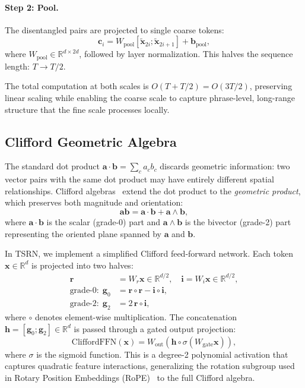 \documentclass[11pt,a4paper]{article}
\newcommand{\R}{\mathbb{R}}
\begin{document}
\paragraph{Step 2: Pool.}  The disentangled pairs are projected to
single coarse tokens:
\begin{equation}
\bm{c}_i = W_{\text{pool}}[\tilde{\bm{x}}_{2i};
  \tilde{\bm{x}}_{2i+1}] + \bm{b}_{\text{pool}},
\label{eq:pool}
\end{equation}
where $W_{\text{pool}} \in \R^{d \times 2d}$, followed by layer
normalization.  This halves the sequence length: $T \to T/2$.

The total computation at both scales is $O(T + T/2) = O(3T/2)$,
preserving linear scaling while enabling the coarse scale to capture
phrase-level, long-range structure that the fine scale processes
locally.

\subsection{Clifford Geometric Algebra}
\label{sec:clifford}

The standard dot product $\bm{a} \cdot \bm{b} = \sum_c a_c b_c$
discards geometric information: two vector pairs with the same dot
product may have entirely different spatial relationships.  Clifford
algebras~\citep{hestenes1984clifford} extend the dot product to the
\emph{geometric product}, which preserves both magnitude and
orientation:
\begin{equation}
\bm{a}\bm{b} = \bm{a} \cdot \bm{b} + \bm{a} \wedge \bm{b},
\end{equation}
where $\bm{a} \cdot \bm{b}$ is the scalar (grade-0) part and
$\bm{a} \wedge \bm{b}$ is the bivector (grade-2) part representing
the oriented plane spanned by $\bm{a}$ and $\bm{b}$.

In TSRN, we implement a simplified Clifford feed-forward network.
Each token $\bm{x} \in \R^d$ is projected into two halves:
\begin{align}
\bm{r} &= W_r \bm{x} \in \R^{d/2}, \quad
\bm{i} = W_i \bm{x} \in \R^{d/2}, \\
\text{grade-0:}\ \ \bm{g}_0 &= \bm{r} \circ \bm{r} - \bm{i} \circ \bm{i},
\label{eq:grade0} \\
\text{grade-2:}\ \ \bm{g}_2 &= 2\,\bm{r} \circ \bm{i},
\label{eq:grade2}
\end{align}
where $\circ$ denotes element-wise multiplication.  The concatenation
$\bm{h} = [\bm{g}_0; \bm{g}_2] \in \R^d$ is passed through a gated
output projection:
\begin{equation}
\text{CliffordFFN}(\bm{x}) = W_{\text{out}}(\bm{h} \circ
  \sigma(W_{\text{gate}} \bm{x})),
\end{equation}
where $\sigma$ is the sigmoid function.  This is a degree-2
polynomial activation that captures quadratic feature interactions,
generalizing the rotation subgroup used in Rotary Position Embeddings
(RoPE)~\citep{su2024roformer} to the full Clifford algebra.
\end{document}
